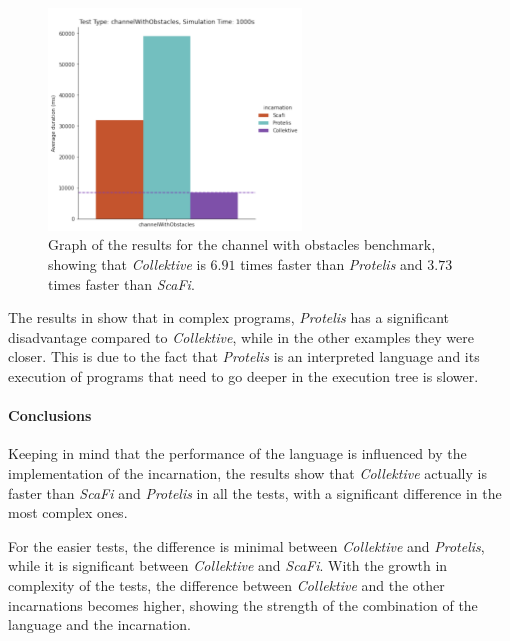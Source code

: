 \begin{figure}[ht!]
    \centering
    \includegraphics[width=0.6\textwidth]{figures/channel-results}
    \caption{Graph of the results for the channel with obstacles benchmark, showing that \emph{Collektive} is $6.91$ times faster
    than \emph{Protelis} and $3.73$ times faster than \emph{ScaFi}.}
    \label{fig:channel-with-obstacles}
\end{figure}

The results in  show that in complex programs, \emph{Protelis} has a significant
disadvantage compared to \emph{Collektive}, while in the other examples they were closer.
This is due to the fact that \emph{Protelis} is an interpreted language and its execution of programs that need to go
deeper in the execution tree is slower.

\paragraph{Conclusions}
Keeping in mind that the performance of the language is influenced by the implementation of the incarnation, the results
show that \emph{Collektive} actually is faster than \emph{ScaFi} and \emph{Protelis} in all the tests, with a significant
difference in the most complex ones.

For the easier tests, the difference is minimal between \emph{Collektive} and \emph{Protelis}, while it is significant
between \emph{Collektive} and \emph{ScaFi}.
With the growth in complexity of the tests, the difference between \emph{Collektive} and the other incarnations becomes
higher, showing the strength of the combination of the language and the incarnation.

